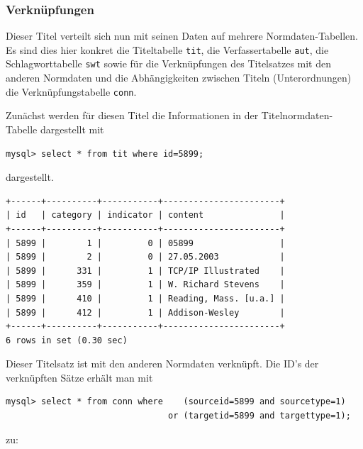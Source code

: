 \documentclass[11pt, twoside, a4paper, BCOR8mm, DIV12, bibtotoc,idxtotoc]{scrbook}
\begin{document}
\subsubsection{Verknüpfungen}
Dieser Titel verteilt sich nun mit seinen Daten auf mehrere
Normdaten-Tabellen. Es sind dies hier konkret die Titeltabelle
\texttt{tit}, die Verfassertabelle \texttt{aut}, die Schlagworttabelle
\texttt{swt} sowie für die Verknüpfungen des Titelsatzes mit den
anderen Normdaten und die Abhängigkeiten zwischen Titeln
(Unterordnungen) die Verknüpfungstabelle \texttt{conn}.

Zunächst werden für diesen Titel die Informationen in der
Titelnormdaten-Tabelle dargestellt mit 

\begin{verbatim}
mysql> select * from tit where id=5899;
\end{verbatim}

dargestellt.

\begin{shadowenv}
\begin{center}
\begin{verbatim}
+------+----------+-----------+-----------------------+
| id   | category | indicator | content               |
+------+----------+-----------+-----------------------+
| 5899 |        1 |         0 | 05899                 |
| 5899 |        2 |         0 | 27.05.2003            |
| 5899 |      331 |         1 | TCP/IP Illustrated    |
| 5899 |      359 |         1 | W. Richard Stevens    |
| 5899 |      410 |         1 | Reading, Mass. [u.a.] |
| 5899 |      412 |         1 | Addison-Wesley        |
+------+----------+-----------+-----------------------+
6 rows in set (0.30 sec)
\end{verbatim}
\end{center}
\end{shadowenv}

Dieser Titelsatz ist mit den anderen Normdaten verknüpft. Die ID's der
verknüpften Sätze erhält man mit

\begin{verbatim}
mysql> select * from conn where    (sourceid=5899 and sourcetype=1) 
                                or (targetid=5899 and targettype=1);
\end{verbatim}

zu:
\end{document}
